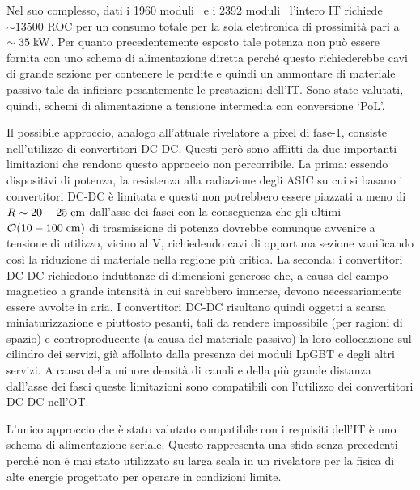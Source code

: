 Nel suo complesso, dati i 1960 moduli \modud\ e i 2392 moduli \moddd\, l'intero IT richiede $\sim13500$ ROC per un consumo totale per la sola elettronica di prossimit\`a pari a $\sim 35\rm \; kW$. Per quanto precedentemente esposto tale potenza non pu\`o essere fornita con uno schema di alimentazione diretta perch\'e questo richiederebbe cavi di grande sezione per contenere le perdite e quindi un ammontare di materiale passivo tale da inficiare pesantemente le prestazioni dell'IT. Sono state valutati, quindi, schemi di alimentazione a tensione intermedia con conversione `PoL'.

Il possibile approccio, analogo all'attuale rivelatore a pixel di fase-1, consiste nell'utilizzo di convertitori DC-DC. Questi per\`o sono afflitti da due importanti limitazioni che rendono questo approccio non percorribile. La prima: essendo dispositivi di potenza, la resistenza alla radiazione degli ASIC su cui si basano i convertitori DC-DC \`e limitata e questi non potrebbero essere piazzati a meno di $R\sim20-25\rm \; cm$ dall'asse dei fasci con la conseguenza che gli ultimi ${\cal O}(10-100\rm \; cm)$ di trasmissione di potenza dovrebbe comunque avvenire a tensione di utilizzo, vicino al V, richiedendo cavi di opportuna sezione vanificando cos\`i la riduzione di materiale nella regione pi\`u critica. La seconda: i convertitori DC-DC richiedono induttanze di dimensioni generose che, a causa del campo magnetico a grande intensit\`a in cui sarebbero immerse, devono necessariamente essere avvolte in aria. I convertitori DC-DC risultano quindi oggetti a scarsa miniaturizzazione e piuttosto pesanti, tali da rendere impossibile (per ragioni di spazio) e controproducente (a causa del materiale passivo) la loro collocazione sul cilindro dei servizi, gi\`a affollato dalla presenza dei moduli LpGBT e degli altri servizi. A causa della minore densit\`a di canali e della pi\`u grande distanza dall'asse dei fasci queste limitazioni sono compatibili con l'utilizzo dei convertitori DC-DC nell'OT.

L'unico approccio che \`e stato valutato compatibile con i requisiti dell'IT \`e uno schema di alimentazione seriale. Questo rappresenta una sfida senza precedenti perch\'e non \`e mai stato utilizzato su larga scala in un rivelatore per la fisica di alte energie progettato per operare in condizioni limite.

